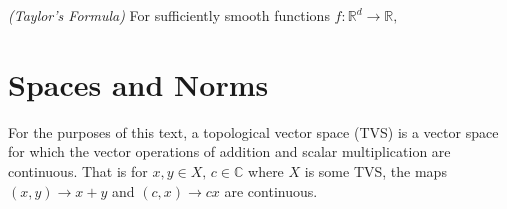 \begin{theorem}
    \textit{(Taylor's Formula)} For sufficiently smooth functions $f:\mathbb{R}^d\rightarrow\mathbb{R},$
\end{theorem}

\section{Spaces and Norms}
For the purposes of this text, a topological vector space (TVS) is a vector space for which the vector operations of addition and scalar multiplication are continuous. That is for $x,y\in X,\,c\in\mathbb{C}$ where $X$ is some TVS, the maps $(x,y)\rightarrow x+y$ and $(c,x)\rightarrow cx$ are continuous.

